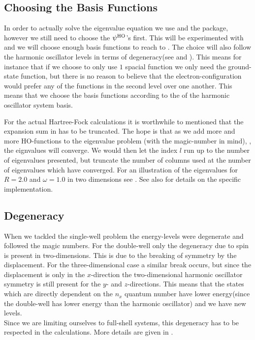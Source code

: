 \subsection{Choosing the Basis Functions}
    In order to actually solve the eigenvalue equation we use  and
    the  package, however we still need to choose the $\psi^{\text{HO}}$'s
    first. This will be experimented with and we will choose enough basis
    functions to reach to . The choice will also
    follow the harmonic oscillator levels in terms of degeneracy(see
     and ). This means for instance that
    if we choose to only use $1$ spacial function we only need the ground-state
    function, but there is no reason to believe that the electron-configuration
    would prefer any of the functions in the second level over one another.
    This means that we choose the basis functions according to the  of the harmonic oscillator system basis.

    For the actual Hartree-Fock calculations it is worthwhile to mentioned that
    the expansion sum in  has to be truncated. The hope
    is that as we add more and more HO-functions to the eigenvalue problem
    (with the magic-number in mind), , the eignvalues will
    converge.  We would then let the index $l$ run up to the number of
    eigenvalues presented, but truncate the number of columns used at the
    number of eigenvalues which have converged. For an illustration of the
    eigenvalues for $R=2.0$ and $\omega=1.0$ in two dimensions see
    . See also  for details on the specific
    implementation.

\subsection{Degeneracy}
    When we tackled the single-well problem the energy-levels were degenerate
    and followed the magic numbers. For the double-well only the degeneracy due
    to spin is present in two-dimensions. This is due to the breaking of
    symmetry by the displacement. For the three-dimensional case a similar
    break occurs, but since the displacement is only in the $x$-direction the
    two-dimensional harmonic oscillator symmetry is still present for the $y$-
    and $z$-directions. This means that the states which are directly dependent
    on the $n_x$ quantum number have lower energy(since the double-well has
    lower energy than the harmonic oscillator) and we have new levels. \\ Since
    we are limiting ourselves to full-shell systems, this degeneracy has to be
    respected in the calculations. More details are given in .
    

